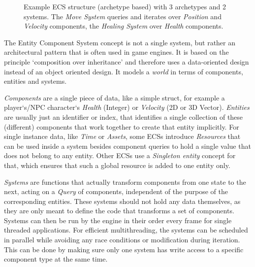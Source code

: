 \begin{figure}
\caption{Example ECS structure (archetype based) with 3 archetypes and 2 systems. The \textit{Move System} queries and iterates over \textit{Position} and \textit{Velocity} components, the \textit{Healing System} over \textit{Health} components.}
\label{fig:ecs}
\end{figure}

The Entity Component System concept is not a single system, but rather an architectural pattern that is often used in game engines. It is based on the principle `composition over inheritance' and therefore uses a data-oriented design instead of an object oriented design. It models a \textit{world} in terms of components, entities and systems.

\textit{Components} are a single piece of data, like a simple struct, for example a player`s/NPC character`s \textit{Health} (Integer) or \textit{Velocity} (2D or 3D Vector). \textit{Entities} are usually just an identifier or index, that identifies a single collection of these (different) components that work together to create that entity implicitly. For single instance data, like \textit{Time} or \textit{Assets}, some ECSs introduce \textit{Resources} that can be used inside a system besides component queries to hold a single value that does not belong to any entity. Other ECSs use a \textit{Singleton entity} concept for that, which ensures that such a global resource is added to one entity only.

\textit{Systems} are functions that actually transform components from one state to the next, acting on a \textit{Query} of components, independent of the purpose of the corresponding entities. These systems should not hold any data themselves, as they are only meant to define the code that transforms a set of components. Systems can then be run by the engine in their order every frame for single threaded applications. For efficient multithreading, the systems can be scheduled in parallel while avoiding any race conditions or modification during iteration. This can be done by making sure only one system has write access to a specific component type at the same time.

